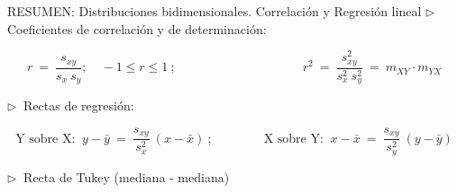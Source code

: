 \begin{myblock}{RESUMEN: Distribuciones bidimensionales. Correlación y Regresión lineal}
\vspace{5mm} $\triangleright \ $ Coeficientes de correlación y de determinación:

$$r\ =\ \dfrac{s_{xy}}{s_x \ s_y};\quad  -1\le r \le 1\ ;
\qquad \qquad \qquad \qquad \qquad 
r^2\ = \ \dfrac{s_{xy}^2}{s_x^2 \ s_y^2} \ = \ m_{XY} \cdot m_{YX}$$

\vspace{5mm} $\triangleright \ $ Rectas de regresión:

$$\text{Y sobre X: } \ y-\bar y \ = \ \dfrac{s_{xy}}{s_x^2} \ (x-\bar x) \ ; 
\qquad \qquad  
\text{X sobre Y: } \ x-\bar x \ = \ \dfrac{s_{xy}}{s_y^2} \ (y-\bar y)$$


\vspace{5mm} $\triangleright \ $ Recta de Tukey (mediana - mediana)

$\quad $
	
\end{myblock}






